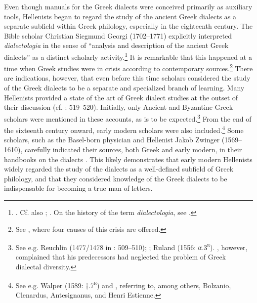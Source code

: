 Even though manuals for the Greek dialects were conceived primarily as auxiliary tools, Hellenists began to regard the study of the ancient Greek dialects as a separate subfield within Greek philology, especially in the eighteenth century. The Bible scholar Christian Siegmund Georgi (1702–1771) explicitly interpreted \textit{dialectologia} in the sense of “analysis and description of the ancient Greek dialects” as a distinct scholarly activity.\footnote{\citet[16]{Georgi1733}. Cf. also \citet[b.1\textsc{\textsuperscript{v}}]{Nibbe1725}; \citet[15]{Hauptmann1737}. On the history of the term \textit{dialectologia}, see \citet[]{VanRooyFcd}.} It is remarkable that this happened at a time when Greek studies were in crisis according to contemporary sources.\footnote{See \citet[86-90]{Reinhard1724}, where four causes of this crisis are offered.} There are indications, however, that even before this time scholars considered the study of the Greek dialects to be a separate and specialized branch of learning. Many Hellenists provided a state of the art of Greek dialect studies at the outset of their discussion (cf. \citealt{VanRooy2014}: 519–520). Initially, only Ancient and Byzantine Greek scholars were mentioned in these accounts, as is to be expected.\footnote{See e.g. Reuchlin (1477/1478 in \citealt{VanRooy2014}: 509–510); \citet[\textsc{r.}iii\textsc{\textsuperscript{r}}; title]{Amerot1520, Amerot1530}; Ruland (1556: α.3\textsc{\textsuperscript{r}}). \citet[a.3\textsc{\textsuperscript{v}}]{Canini1555}, however, complained that his predecessors had neglected the problem of Greek dialectal diversity.} From the end of the sixteenth century onward, early modern scholars were also included.\footnote{See e.g. Walper (1589: †.7\textsc{\textsuperscript{r}}) and \citet[1]{Schmidt1604}, referring to, among others, Bolzanio, Clenardus, Antesignanus, and Henri Estienne.} Some scholars, such as the Basel-born physician and Hellenist Jakob Zwinger (1569–1610), carefully indicated their sources, both Greek and early modern, in their handbooks on the dialects \citep{Zwinger1605}{.} This likely demonstrates that early modern Hellenists widely regarded the study of the dialects as a well-defined subfield of Greek philology, and that they considered knowledge of the Greek dialects to be indispensable for becoming a true man of letters.

